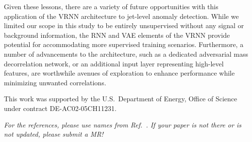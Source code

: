 \documentclass[letterpaper,11pt]{article}
\begin{document}
Given these lessons, there are a variety of future opportunities with this application of the VRNN architecture to jet-level anomaly detection. While we limited our scope in this study to be entirely unsupervised without any signal or background information, the RNN and VAE elements of the VRNN provide potential for accommodating more supervised training scenarios. Furthermore, a number of advancements to the architecture, such as a dedicated adversarial mass decorrelation network, or an additional input layer representing high-level features, are worthwhile avenues of exploration to enhance performance while minimizing unwanted correlations. 



\acknowledgments

This work was supported by the U.S.~Department of Energy, Office of Science under contract DE-AC02-05CH11231. 

\vspace{10mm}

\noindent \textit{For the references, please use names from Ref.~\cite{hepmllivingreview}.  If your paper is not there or is not updated, please submit a MR!}



\end{document}

